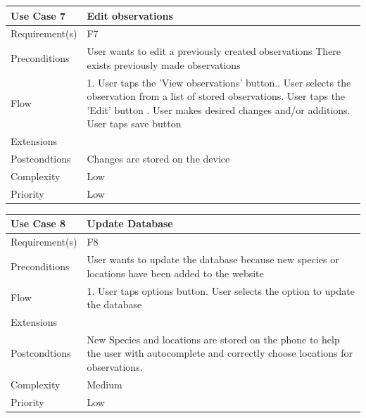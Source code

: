 \begin{tabular}[t]{|l|p{}|}\hline
	Use Case 7&Edit observations\\\hline
	Requirement(s)&F7\\\hline
	Preconditions&User wants to edit a previously created observations\newline 
	There exists previously made observations\\\hline
	Flow&1. User taps the 'View observations' button.\newline
	2. User selects the observation from a list of stored observations\newline
	3. User taps the 'Edit' button \newline
	4. User makes desired changes and/or additions\newline
	5. User taps save button\\\hline
	Extensions& \\\hline
	Postcondtions&Changes are stored on the device\\\hline
	Complexity&Low\\\hline
	Priority&Low\\\hline
\end{tabular}

\hspace{2em}

\begin{tabular}[t]{|l|p{}|}\hline
	Use Case 8&Update Database\\\hline
	Requirement(s)&F8\\\hline
	Preconditions&User wants to update the database because new species or 
	locations have been added to the website\\\hline
	Flow&1. User taps options button\newline
	2. User selects the option to update the database\\\hline
	Extensions& \\\hline
	Postcondtions&New Species and locations are stored on the phone to help
	the user with autocomplete and correctly choose locations for observations.\\\hline
	Complexity&Medium\\\hline
	Priority&Low\\\hline
\end{tabular}
